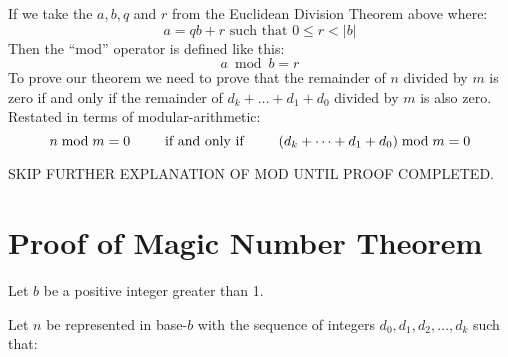 \documentclass{article}
\begin{document}
If we take the $a,b,q$ and $r$ from the Euclidean Division Theorem above where:
\[a=qb+r  \text{ such that } 0\le{}r<\lvert{}b\rvert\]
Then the ``mod'' operator is defined like this:
\[a\bmod{b} = r\]
%
%
%
%
%
To prove our theorem we need to prove that 
the remainder of $n$ divided by $m$ is zero if and only if
the remainder of $d_k+\dots+d_1+d_0$ divided by $m$ 
is also zero.
Restated in terms of
modular-arithmetic:
\[n\bmod{m} = 0\text{\hspace{2.5em}if and only if\hspace{2.5em}}(d_k+\dots+d_1+d_0)\bmod{m} = 0\]

SKIP FURTHER EXPLANATION OF MOD UNTIL PROOF COMPLETED.

\section*{Proof of Magic Number Theorem}

Let $b$ be a positive integer greater than 1.

Let $n$ be represented in base-$b$ with the sequence
of integers $d_0, d_1, d_2,\dots{},d_k$ such that:
\end{document}
